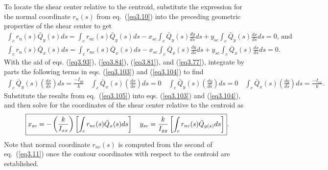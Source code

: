 \documentclass{AeroStructure-ERJohnson}
\begin{document}
To locate the shear center relative to the centroid, substitute the expression for the normal coordinate $r_{n}(s)$ from eq.~(\ref{eq3.10}) into the preceding geometric properties of the shear center to get
\begin{gather}
\int_{c} r_{n}(s) \bar{Q}_{y}(s) d s=\int_{c} r_{n c}(s) \bar{Q}_{y}(s) d s-x_{s c} \int_{c} \bar{Q}_{y}(s) \frac{d y}{d s} d s+y_{s c} \int_{c} \bar{Q}_{y}(s) \frac{d x}{d s} d s=0\mbox{, and}\label{eq3.103}\\
\int_{c} r_{n}(s) \bar{Q}_{x}(s) d s=\int_{c} r_{n c}(s) \bar{Q}_{x}(s) d s-x_{s c} \int_{c} \bar{Q}_{x}(s) \frac{d y}{d s} d s+y_{s c} \int_{c} \bar{Q}_{x}(s) \frac{d x}{d s} d s=0.\label{eq3.104}
\end{gather}
With the aid of eqs. (\ref{eq3.93}), (\ref{eq3.84}), (\ref{eq3.81}), and (\ref{eq3.77}), integrate by parts the following terms in eqs. (\ref{eq3.103}) and (\ref{eq3.104}) to find
\begin{align}\label{eq3.105}
\int_{c} \bar{Q}_{y}(s)\left(\frac{d x}{d s}\right) d s=\frac{-I_{y y}}{k} \quad \int_{c} \bar{Q}_{x}(s)\left(\frac{d x}{d s}\right) d s=0 \quad \int_{c} \bar{Q}_{y}(s)\left(\frac{d y}{d s}\right) d s=0 \quad \int_{c} \bar{Q}_{x}(s)\left(\frac{d y}{d s}\right) d s=\frac{-I_{x x}}{k}.
\end{align}
Substitute the results from eq.~(\ref{eq3.105}) into eqs. (\ref{eq3.103}) and (\ref{eq3.104}), and then solve for the coordinates of the shear center relative to the centroid as
\begin{align}\label{eq3.106}
\fbox{$\displaystyle x_{s c}=-\left(\frac{k}{I_{x x}}\right)\left[\int_{c} r_{n c}(s) \bar{Q}_{x}(s) d s\right] \quad y_{s c}=\frac{k}{I_{y y}}\left[\int_{c} r_{n c}(s) \bar{Q}_{y(s)} d s\right]$}.
\end{align}
Note that normal coordinate $r_{n c}(s)$ is computed from the second of eq.~(\ref{eq3.11}) once the contour coordinates with respect to the centroid are established.\vspace*{-10pt}
\end{document}
